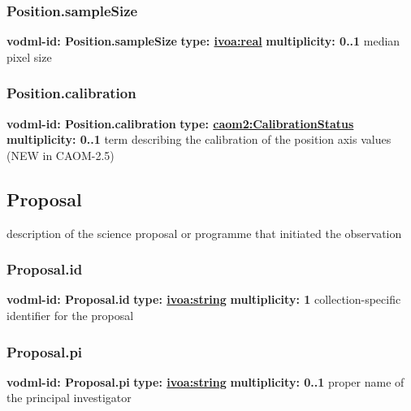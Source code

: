     \subsubsection{Position.sampleSize}
      \textbf{vodml-id: Position.sampleSize} \newline
      \textbf{type: \hyperref[sect:ivoa]{ivoa:real}} \newline
      \textbf{multiplicity: 0..1} \newline
      median pixel size

    \subsubsection{Position.calibration}
      \textbf{vodml-id: Position.calibration} \newline
      \textbf{type: \hyperref[sect:CalibrationStatus]{caom2:CalibrationStatus}} \newline
      \textbf{multiplicity: 0..1} \newline
      term describing the calibration of the position axis values (NEW in CAOM-2.5)

  \subsection{Proposal}
  \label{sect:Proposal}
    description of the science proposal or programme that initiated the observation

    \subsubsection{Proposal.id}
      \textbf{vodml-id: Proposal.id} \newline
      \textbf{type: \hyperref[sect:ivoa]{ivoa:string}} \newline
      \textbf{multiplicity: 1} \newline
      collection-specific identifier for the proposal

    \subsubsection{Proposal.pi}
      \textbf{vodml-id: Proposal.pi} \newline
      \textbf{type: \hyperref[sect:ivoa]{ivoa:string}} \newline
      \textbf{multiplicity: 0..1} \newline
      proper name of the principal investigator

